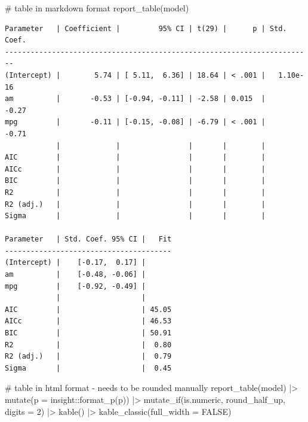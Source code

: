 \documentclass[
  letterpaper,
  DIV=11,
  numbers=noendperiod]{scrreprt}
\newenvironment{Shaded}{\begin{snugshade}}{\end{snugshade}}
\newcommand{\AttributeTok}[1]{\textcolor[rgb]{0.40,0.45,0.13}{#1}}
\newcommand{\CommentTok}[1]{\textcolor[rgb]{0.37,0.37,0.37}{#1}}
\newcommand{\ConstantTok}[1]{\textcolor[rgb]{0.56,0.35,0.01}{#1}}
\newcommand{\DecValTok}[1]{\textcolor[rgb]{0.68,0.00,0.00}{#1}}
\newcommand{\FunctionTok}[1]{\textcolor[rgb]{0.28,0.35,0.67}{#1}}
\newcommand{\NormalTok}[1]{\textcolor[rgb]{0.00,0.23,0.31}{#1}}
\newcommand{\SpecialCharTok}[1]{\textcolor[rgb]{0.37,0.37,0.37}{#1}}
\begin{document}
\begin{Shaded}
\begin{Highlighting}[]
\CommentTok{\# table in markdown format}
\FunctionTok{report\_table}\NormalTok{(model)}
\end{Highlighting}
\end{Shaded}

\begin{verbatim}
Parameter   | Coefficient |         95% CI | t(29) |      p | Std. Coef.
------------------------------------------------------------------------
(Intercept) |        5.74 | [ 5.11,  6.36] | 18.64 | < .001 |   1.10e-16
am          |       -0.53 | [-0.94, -0.11] | -2.58 | 0.015  |      -0.27
mpg         |       -0.11 | [-0.15, -0.08] | -6.79 | < .001 |      -0.71
            |             |                |       |        |           
AIC         |             |                |       |        |           
AICc        |             |                |       |        |           
BIC         |             |                |       |        |           
R2          |             |                |       |        |           
R2 (adj.)   |             |                |       |        |           
Sigma       |             |                |       |        |           

Parameter   | Std. Coef. 95% CI |   Fit
---------------------------------------
(Intercept) |    [-0.17,  0.17] |      
am          |    [-0.48, -0.06] |      
mpg         |    [-0.92, -0.49] |      
            |                   |      
AIC         |                   | 45.05
AICc        |                   | 46.53
BIC         |                   | 50.91
R2          |                   |  0.80
R2 (adj.)   |                   |  0.79
Sigma       |                   |  0.45
\end{verbatim}

\begin{Shaded}
\begin{Highlighting}[]
\CommentTok{\# table in html format {-} needs to be rounded manually}
\FunctionTok{report\_table}\NormalTok{(model) }\SpecialCharTok{|\textgreater{}}
  \FunctionTok{mutate}\NormalTok{(}\AttributeTok{p =}\NormalTok{ insight}\SpecialCharTok{::}\FunctionTok{format\_p}\NormalTok{(p)) }\SpecialCharTok{|\textgreater{}}
  \FunctionTok{mutate\_if}\NormalTok{(is.numeric, round\_half\_up, }\AttributeTok{digits =} \DecValTok{2}\NormalTok{) }\SpecialCharTok{|\textgreater{}}
  \FunctionTok{kable}\NormalTok{() }\SpecialCharTok{|\textgreater{}}
  \FunctionTok{kable\_classic}\NormalTok{(}\AttributeTok{full\_width =} \ConstantTok{FALSE}\NormalTok{)}
\end{Highlighting}
\end{Shaded}
\end{document}
